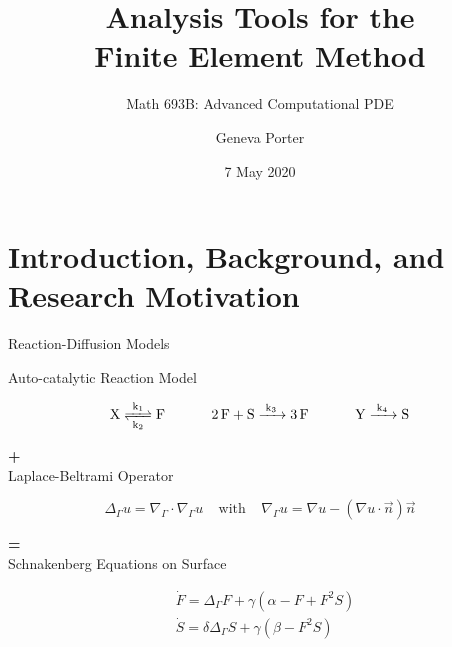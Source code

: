 \documentclass{beamer}
\title{Analysis Tools for the \\Finite Element Method}
\subtitle{Math 693B: Advanced Computational PDE}
\author{Geneva Porter}
\institute{San Diego State University\\ Applied Mathematics}
\date{7 May 2020}
\begin{document}
\AtBeginSection{}

    \begin{frame}
        \maketitle
    \end{frame}

    
    \section[Introduction]{Introduction, Background, and Research Motivation}
    
        \begin{frame}{Reaction-Diffusion Models}    
            
			\begin{center}
				{\large Auto-catalytic Reaction Model}\\
				\vspace{-5mm}
				
				\begin{large}
					$$ \ce{X <=>[k_1][k_2] F} ~~~~~~~~~~ \ce{2F + S ->[k_3] 3F} ~~~~~~~~~~ \ce{Y ->[k_4] S} $$
				\end{large}
				
				
				\vspace{-5mm}
				
				{\Huge \textbf{+}} \\
				
				
				{\large Laplace-Beltrami Operator}\\
				\vspace{-5mm}
				
				\begin{equation*}
				\label{Laplace-Beltrami}
				\Delta_\Gamma u = \nabla_\Gamma\cdot\nabla_\Gamma u ~~~~~ \text{with} ~~~~~ \nabla_\Gamma u = \nabla u-(\nabla u\cdot\vec{n})\vec{n}
				\end{equation*}
				\vspace{-5mm}
				
				
				
				{\Huge \textbf{=}} \\
				
				
				{\large Schnakenberg Equations on Surface}\\
				\vspace{-5mm}
				
				\begin{equation*}
				\begin{aligned}
				& \dot{F} = \Delta_\Gamma F + 
				\gamma\left(\alpha - F + F^2S\right)\\
				& \dot{S} = \delta\Delta_\Gamma S + 
				\gamma\left(\beta - F^2S\right)\\
				\end{aligned}
				\end{equation*}
				
			\end{center}
		\end{frame}
	
\end{document}
